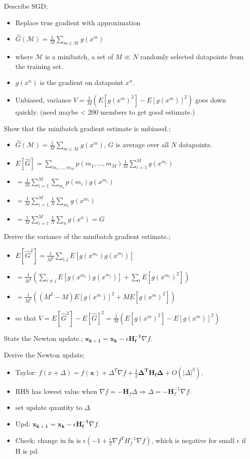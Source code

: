 \documentclass{article}
\begin{document}
Describe SGD; \begin{itemize}
	\item Replace true gradient with approximation 
	\item $\hat{G}(\mathcal{M}) = \frac{1}{M}\sum_{m\in\mathcal{M}} g(x^m)$
	\item where $\mathcal{M}$ is a minibatch, a set of $M\ll N$ randomly selected datapoints from the training set.
	\item $g(x^n)$ is the gradient on datapoint $x^n$.
	\item Unbiased, variance $V=\frac{1}{M}(E[g(x^m)^2]-E[g(x^m)]^2)$ goes down quickly. (need maybe < 200 members to get good estimate.)
\end{itemize}

Show that the minibatch gradient estimate is unbiased.; \begin{itemize}
	\item $\hat{G}(\mathcal{M}) = \frac{1}{M}\sum_{m\in\mathcal{M}} g(x^m)$, $G$ is average over all $N$ datapoints.
	\item $E[\hat{G}] = \sum_{m_1,...,m_M} p(m_1,...,m_M)\frac{1}{M}\sum_{i=1}^M g(x^{m_i})$
	\item $= \frac{1}{M}\sum_{i=1}^M\sum_{m_i} p(m_i)g(x^{m_i})$
	\item $=\frac{1}{M}\sum_{i=1}^M\frac{1}{N}\sum_{m_i}g(x^{m_i})$
	\item $=\frac{1}{M}\sum_{i=1}^M\frac{1}{N}\sum_{n}g(x^{n})=G$
\end{itemize}

Derive the variance of the minibatch gradient estimate.; \begin{itemize}
	\item $E[\hat{G}^2] = \frac{1}{M^2}\sum_{i,j}E[g(x^{m_i})g(x^{m_j})]$
	\item $=\frac{1}{M^2}(\sum_{i\ne j}E[g(x^{m_i})g(x^{m_j})]+\sum_i E[g(x^{m_i})^2])$
	\item $=\frac{1}{M^2}((M^2-M)E[g(x^{m})]^2 + M E[g(x^{m})^2])$
	\item so that $V=E[\hat{G}^2]-E[\hat{G}]^2 = \frac{1}{M}(E[g(x^{m})^2]- E[g(x^{m})]^2)$
\end{itemize}

State the Newton update.; $\mathbf{x_{k+1} = x_k} - \epsilon\mathbf{H^{-1}_f}\nabla f$.

Derive the Newton update; \begin{itemize}
	\item Taylor: $f(x+\Delta) = f(\mathbf{x}) + \Delta^T\nabla f + \frac{1}{2}\mathbf{\Delta^T H_f \Delta} + O(|\Delta|^3)$.
	\item RHS has lowest value when $\nabla f = -\mathbf{H}_f\Delta \Rightarrow \Delta = -\mathbf{H}^{-1}_f \nabla f$.
	\item set update quantity to $\Delta$
	\item Upd: $\mathbf{x_{k+1} = x_k} - \epsilon\mathbf{H^{-1}_f}\nabla f$.
	\item Check: change in fn is $\epsilon (-1+\frac{\epsilon}{2}\nabla f^T H^{-1}_f\nabla f)$, which is negative for small $\epsilon$ if H is pd.
\end{itemize}
\end{document}
